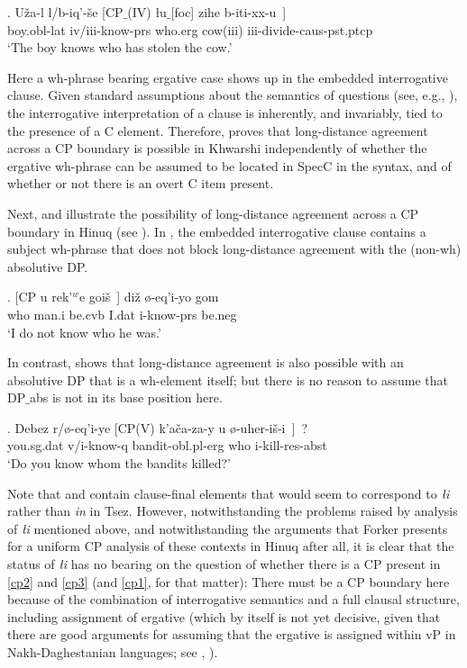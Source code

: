 \documentclass[output=paper
,modfonts
,nonflat]{langsci/langscibook}
\begin{document}
\exig.  U\v{z}a-l l/b-iq'-\v{s}e [CP$\_${\rm (IV)} \l \label{cp1}u$\_${\rm [foc]} zihe b-iti-xx-u~] \\
boy.{\sc obl-lat} {\sc iv/iii}-know-{\sc prs} {} who.{\sc erg} cow({\sc iii}) {\sc iii}-divide-{\sc caus-pst.ptcp} \\
 `The boy knows who has stolen the cow.'

Here a wh-phrase bearing ergative case shows up in the embedded
interrogative clause. Given standard assumptions about the
semantics of questions (see, e.g., \cite{Stechow:96:aga}),
the interrogative interpretation of a clause is inherently, and
invariably, tied to the presence of a C element. Therefore, \Last
proves that long-distance agreement across a CP boundary is possible
in Khwarshi independently of whether the ergative wh-phrase can be
assumed to be located in SpecC in the syntax, and of whether or not
there is an overt C item present. 

Next, \Next and \NNext illustrate the possibility of long-distance
agreement across a CP boundary in Hinuq (see \cite{Forker:11}). In
\Next, the embedded interrogative clause contains a subject
wh-phrase that does not block long-distance agreement with the
(non-wh) absolutive DP. 

 \exig. [CP \textbeltl u rek'$^{w}$e go\textbeltl \label{cp2}i\v{s}~] di\v{z} \o -eq'i-yo gom \\
  {} who man.{\sc i} be.{\sc cvb} I.{\sc dat} {\sc i}-know-{\sc prs}
  be.{\sc neg} \\ 
 `I do not know who he was.'

In contrast, \Next shows that long-distance agreement is also possible with
an absolutive DP that is a wh-element itself; but there is no reason
to assume that DP$\_${abs} is not in its base position here. 

 \exig.  \label{cp3}Debez r/\o -eq'i-ye [CP(V) k'a\v{c}a\textgamma -za-y \textbeltl u \o -uher-i\v{s}-\textbeltl i~]~? \\
  you.{\sc sg.dat} {\sc v/i}-know-{\sc q} {} bandit-{\sc obl.pl-erg}
  who {\sc i}-kill-{\sc res-abst} \\ 
 `Do you know whom the bandits killed?'

Note that \LLast and \Last contain clause-final elements that
would seem to correspond to {\it {\l}i} rather than  {\it
  \textcrlambda in} in Tsez. However, notwithstanding the problems
raised by  analysis of {\it {\l}i}
mentioned above, and notwithstanding the arguments that Forker
presents for a uniform CP analysis of these contexts in Hinuq after
all, it is clear that the status of {\it {\l}i} has no bearing on the
question of whether there is a CP present in \ref{cp2} and \ref{cp3}
(and \ref{cp1}, for that matter): There must be a CP boundary here
because of the combination of interrogative semantics and a full
clausal structure, including assignment of ergative (which by itself
is not yet decisive, given that there are good arguments for assuming
that the ergative is assigned within vP in Nakh-Daghestanian
languages; see \cite{Gagliardietal:14}, \cite{Polinsky:16:arc}). 
\end{document}
